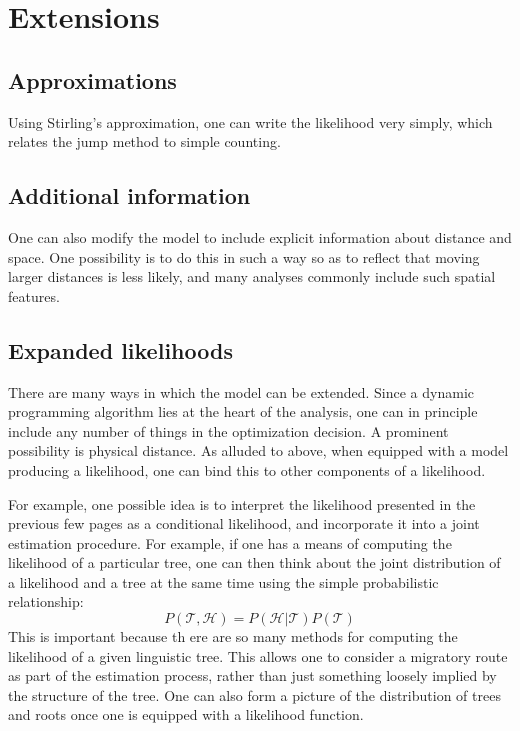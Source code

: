 \documentclass[11pt]{article}
\begin{document}
\section{Extensions}

\subsection{Approximations}

Using Stirling's approximation, one can write the likelihood very simply, which relates the jump method to simple counting. 

\subsection{Additional information}

One can also modify the model to include explicit information about distance and space. One possibility is to do this in such a way so as to reflect that moving larger distances is less likely, and many analyses commonly include such spatial features.

\subsection{Expanded likelihoods}
There are many ways in which the model can be extended. Since a dynamic programming algorithm lies at the heart of the analysis, one can in principle include any number of things in the optimization decision.  A prominent possibility  is physical distance. As alluded to above, when equipped with a model producing a likelihood, one can bind this to other components of a likelihood. 

For example, one possible idea is to interpret the likelihood presented in the previous few pages as a conditional likelihood, and incorporate it into a joint estimation procedure. For example, if one has a means of computing the likelihood of a particular tree, one can then think about the joint distribution of a likelihood and a tree at the same time using the simple probabilistic relationship:
$$
P(\mathcal{T},\mathcal{H})=P(\mathcal{H}|\mathcal{T})P(\mathcal{T})
$$
This is important because th
ere are so many methods for computing the likelihood of a given linguistic tree. This allows one to consider a migratory route as part of the estimation process, rather than just something loosely implied by the structure of the tree. One can also form a picture of the distribution of trees and roots once one is equipped with a likelihood function. 
\end{document}
